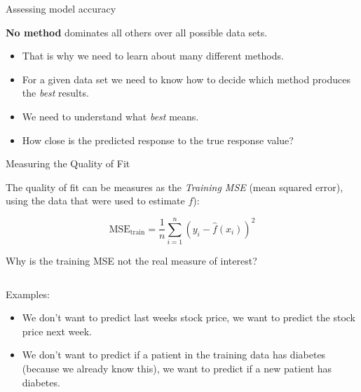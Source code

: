 \documentclass[ignorenonframetext,]{beamer}
\providecommand{\tightlist}{%
  \setlength{\itemsep}{0pt}\setlength{\parskip}{0pt}}
\begin{document}
\begin{frame}{Assessing model accuracy}
\protect\hypertarget{assessing-model-accuracy}{}

\textbf{No method} dominates all others over all possible data sets.

\begin{itemize}
\tightlist
\item
  That is why we need to learn about many different methods.
\item
  For a given data set we need to know how to decide which method
  produces the \emph{best} results.
\item
  We need to understand what \emph{best} means.
\item
  How close is the predicted response to the true response value?
\end{itemize}

\end{frame}

\begin{frame}

\begin{block}{Measuring the Quality of Fit}

\vspace{2mm}

The quality of fit can be measures as the \emph{Training MSE} (mean
squared error), using the data that were used to estimate \(f\)):

\[ \text{MSE}_{\text{train}}=\frac{1}{n}\sum_{i=1}^n (y_i-\hat{f}(x_i))^2\]
\(~\)

\end{block}

\end{frame}

\begin{frame}

Why is the training MSE not the real measure of interest?

\(~\)

Examples:

\begin{itemize}
\item
  We don't want to predict last weeks stock price, we want to predict
  the stock price next week.
\item
  We don't want to predict if a patient in the training data has
  diabetes (because we already know this), we want to predict if a new
  patient has diabetes.
\end{itemize}

\end{frame}
\end{document}
